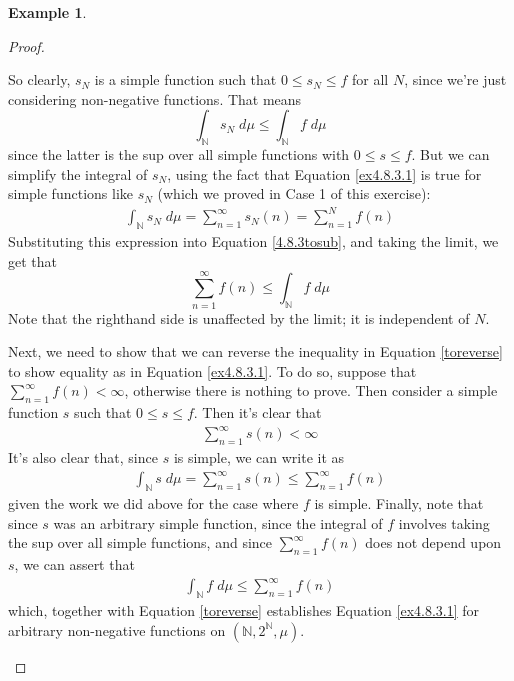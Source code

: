 \documentclass[12pt]{article}
\theoremstyle{plain}
\theoremstyle{definition}
\newtheorem{ex}[thm]{Example}
\theoremstyle{remark}
\begin{document}
\begin{ex}
\begin{proof}
\begin{enumerate}
      So clearly, $s_N$ is a simple function such that $0\leq s_N \leq
      f$ for all $N$, since we're just considering non-negative
      functions.  That means
      \begin{equation}
          \label{4.8.3tosub}
          \int_\mathbb{N} s_N \;d\mu \leq
          \int_\mathbb{N} f \;d\mu
      \end{equation}
      since the latter is the sup over all simple functions with $0\leq
      s\leq f$. But we can simplify the integral of $s_N$, using the
      fact that Equation \ref{ex4.8.3.1} is true for simple functions
      like $s_N$ (which we proved in Case 1 of this exercise):
      \begin{align*}
        \int_\mathbb{N} s_N \;d\mu = \sum^\infty_{n=1}s_N(n)
        = \sum^N_{n=1} f(n)
      \end{align*}
      Substituting this expression into Equation \ref{4.8.3tosub}, and
      taking the limit, we get that
      \begin{equation}
          \label{toreverse}
          \sum^\infty_{n=1} f(n) \leq \int_\mathbb{N} f\; d\mu
      \end{equation}
      Note that the righthand side is unaffected by the limit; it is
      independent of $N$.

      Next, we need to show that we can reverse the inequality in
      Equation \ref{toreverse} to show equality as in Equation
      \ref{ex4.8.3.1}. To do so, suppose that $\sum^\infty_{n=1}
      f(n)<\infty$, otherwise there is nothing to prove. Then consider a
      simple function $s$ such that $0\leq s \leq f$. Then it's clear
      that
      \begin{align*}
        \sum^\infty_{n=1} s(n)<\infty
      \end{align*}
      It's also clear that, since $s$ is simple, we can write it as
      \begin{align*}
        \int_\mathbb{N} s \; d\mu = \sum^\infty_{n=1} s(n)
        \leq \sum^\infty_{n=1} f(n)
      \end{align*}
      given the work we did above for the case where $f$ is simple.
      Finally, note that since $s$ was an arbitrary simple function,
      since the integral of $f$ involves taking the sup over all simple
      functions, and since $\sum^\infty_{n=1}f(n)$ does not depend upon
      $s$, we can assert that
      \begin{align*}
        \int_\mathbb{N} f \; d\mu \leq \sum^\infty_{n=1} f(n)
      \end{align*}
      which, together with Equation \ref{toreverse} establishes Equation
      \ref{ex4.8.3.1} for arbitrary non-negative functions on
      $(\mathbb{N}, 2^\mathbb{N}, \mu)$.
\end{enumerate}
\end{proof}
\end{ex}
\end{document}
